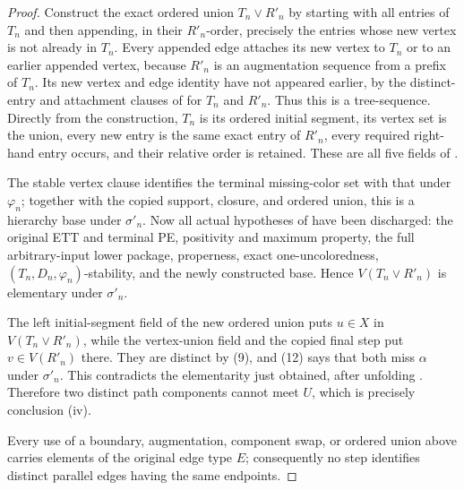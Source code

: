 \begin{proof}
Construct the exact ordered union $T_n\vee R'_n$ by starting with all
entries of $T_n$ and then appending, in their $R'_n$-order, precisely
the entries whose new vertex is not already in $T_n$.  Every appended
edge attaches its new vertex to $T_n$ or to an earlier appended vertex,
because $R'_n$ is an augmentation sequence from a prefix of $T_n$.
Its new vertex and edge identity have not appeared earlier, by the
distinct-entry and attachment clauses of  for
$T_n$ and $R'_n$.  Thus this is a
tree-sequence.  Directly from the construction, $T_n$ is its ordered
initial segment, its vertex set is the union, every new entry is the
same exact entry of $R'_n$, every required right-hand entry occurs, and
their relative order is retained.  These are all five fields of
.

The stable vertex clause identifies
the terminal missing-color set with that under $\varphi_n$; together
with the copied support, closure, and ordered union, this is a hierarchy
base under $\sigma'_n$.  Now all actual hypotheses of
 have been discharged: the
original ETT and terminal PE, positivity and maximum property, the full
arbitrary-input lower package, properness, exact one-uncoloredness,
$(T_n,D_n,\varphi_n)$-stability, and the newly constructed base.  Hence
$V(T_n\vee R'_n)$ is elementary under $\sigma'_n$.

The left initial-segment field of the new ordered union puts $u\in X$ in
$V(T_n\vee R'_n)$, while the vertex-union field and the copied final step
put $v\in V(R'_n)$ there.  They are distinct by (9), and (12) says that
both miss $\alpha$ under $\sigma'_n$.  This contradicts the elementarity
just obtained, after unfolding
.  Therefore two distinct path
components cannot meet $U$, which is precisely conclusion (iv).

Every use of a boundary, augmentation, component swap, or ordered union
above carries elements of the original edge type $E$; consequently no
step identifies distinct parallel edges having the same endpoints.
\end{proof}
